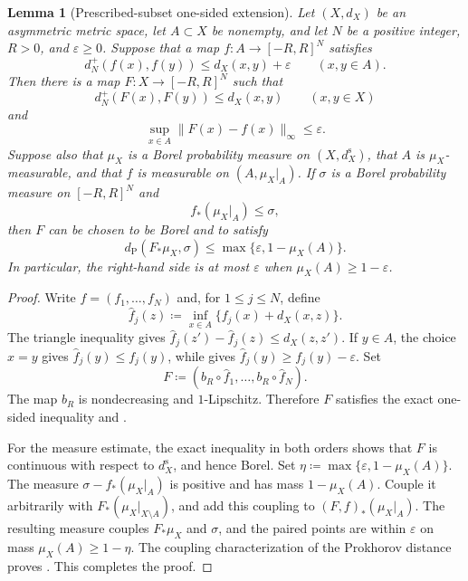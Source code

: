 \documentclass{amsart}
\theoremstyle{plain}
\newtheorem{lemma}[theorem]{Lemma}
\theoremstyle{definition}
\theoremstyle{remark}
\newcommand{\dpr}{d_{\operatorname{P}}}
\begin{document}
\begin{lemma}[Prescribed-subset one-sided extension]
\label{lem:prescribed-subset-one-sided-extension}
Let $(X,d_X)$ be an asymmetric metric space, let $A\subset X$ be nonempty,
and let $N$ be a positive integer, $R>0$, and $\varepsilon\geq0$.  Suppose that
a map $f\colon A\to[-R,R]^N$ satisfies
\begin{equation}
\label{eq:prescribed-subset-one-sided-condition}
d_N^+(f(x),f(y))\leq d_X(x,y)+\varepsilon\qquad(x,y\in A).
\end{equation}
Then there is a map $F\colon X\to[-R,R]^N$ such that
\[
d_N^+(F(x),F(y))\leq d_X(x,y)\qquad(x,y\in X)
\]
and
\begin{equation}
\label{eq:prescribed-subset-extension-error}
\sup_{x\in A}\lVert F(x)-f(x)\rVert_\infty\leq\varepsilon.
\end{equation}
Suppose also that $\mu_X$ is a Borel probability measure on
$(X,d_X^{\mathrm s})$, that $A$ is $\mu_X$-measurable, and that $f$ is
measurable on $(A,\mu_X|_A)$.  If $\sigma$ is a Borel probability measure
on $[-R,R]^N$ and
\[
f_*(\mu_X|_A)\leq\sigma,
\]
then $F$ can be chosen to be Borel and to satisfy
\begin{equation}
\label{eq:prescribed-subset-extension-prokhorov}
\dpr(F_*\mu_X,\sigma)\leq
\max\{\varepsilon,1-\mu_X(A)\}.
\end{equation}
In particular, the right-hand side is at most $\varepsilon$ when
$\mu_X(A)\geq1-\varepsilon$.
\end{lemma}

\begin{proof}
Write $f=(f_1,\ldots,f_N)$ and, for $1\leq j\leq N$, define
\[
\widehat f_j(z)\coloneqq\inf_{x\in A}\{f_j(x)+d_X(x,z)\}.
\]
The triangle inequality gives
$\widehat f_j(z')-\widehat f_j(z)\leq d_X(z,z')$.  If $y\in A$, the choice
$x=y$ gives $\widehat f_j(y)\leq f_j(y)$, while
 gives
$\widehat f_j(y)\geq f_j(y)-\varepsilon$.  Set
\[
F\coloneqq(b_R\circ\widehat f_1,\ldots,b_R\circ\widehat f_N).
\]
The map $b_R$ is nondecreasing and $1$-Lipschitz.  Therefore $F$ satisfies
the exact one-sided inequality and
.

For the measure estimate, the exact inequality in both orders shows that
$F$ is continuous with respect to $d_X^{\mathrm s}$, and hence Borel.  Set
$\eta\coloneqq\max\{\varepsilon,1-\mu_X(A)\}$.  The measure
$\sigma-f_*(\mu_X|_A)$ is positive and has mass $1-\mu_X(A)$.  Couple it
arbitrarily with $F_*(\mu_X|_{X\setminus A})$, and add this coupling to
$(F,f)_*(\mu_X|_A)$.  The resulting measure couples $F_*\mu_X$ and
$\sigma$, and the paired points are within $\varepsilon$ on mass
$\mu_X(A)\geq1-\eta$.  The coupling characterization of the Prokhorov
distance proves .  This
completes the proof.
\end{proof}
\end{document}
